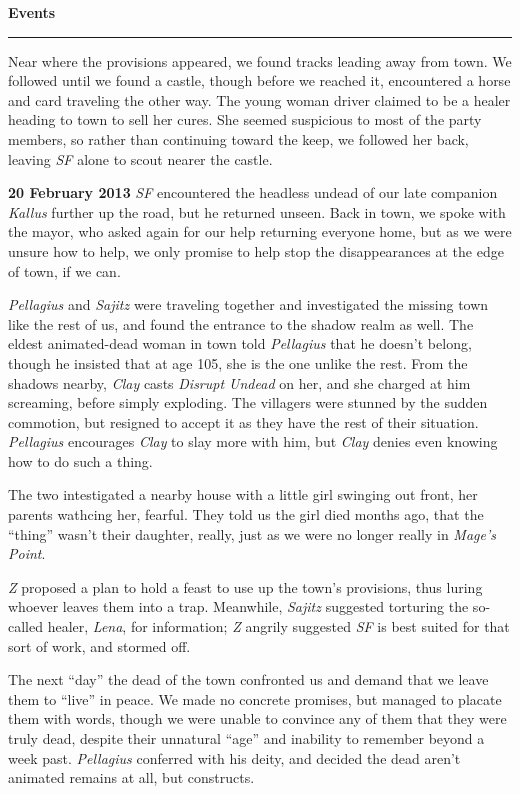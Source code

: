 \documentclass[letterpaper]{article}
\newcommand{\e}[1]{\emph{#1}}
\newcommand{\B}[1]{\textbf{#1}}
\newenvironment{notesection}[1]
{ {\huge \B{#1}}\hrule\vspace{0.5em}\begingroup\fontsize{9pt}{12pt}\selectfont}
{\endgroup}
\begin{document}
\begin{notesection}{Events}
Near where the provisions appeared, we found tracks leading away from town.  We followed until we found a castle, though before we reached it, encountered a horse and card traveling the other way.  The young woman driver claimed to be a healer heading to town to sell her cures.  She seemed suspicious to most of the party members, so rather than continuing toward the keep, we followed her back, leaving \e{SF} alone to scout nearer the castle.


\B{20 February 2013} \e{SF} encountered the headless undead of our late companion \e{Kallus} further up the road, but he returned unseen.  Back in town, we spoke with the mayor, who asked again for our help returning everyone home, but as we were unsure how to help, we only promise to help stop the disappearances at the edge of town, if we can.

\e{Pellagius} and \e{Sajitz} were traveling together and investigated the missing town like the rest of us, and found the entrance to the shadow realm as well.  The eldest animated-dead woman in town told \e{Pellagius} that he doesn't belong, though he insisted that at age 105, she is the one unlike the rest.  From the shadows nearby, \e{Clay} casts \e{Disrupt Undead} on her, and she charged at him screaming, before simply exploding.  The villagers were stunned by the sudden commotion, but resigned to accept it as they have the rest of their situation.  \e{Pellagius} encourages \e{Clay} to slay more with him, but \e{Clay} denies even knowing how to do such a thing.

The two intestigated a nearby house with a little girl swinging out front, her parents wathcing her, fearful. They told us the girl died months ago, that the ``thing'' wasn't their daughter, really, just as we were no longer really in \e{Mage's Point}.

\e{Z} proposed a plan to hold a feast to use up the town's provisions, thus luring whoever leaves them into a trap.  Meanwhile, \e{Sajitz} suggested torturing the so-called healer, \e{Lena}, for information; \e{Z} angrily suggested \e{SF} is best suited for that sort of work, and stormed off.

The next ``day'' the dead of the town confronted us and demand that we leave them to ``live'' in peace.  We made no concrete promises, but managed to placate them with words, though we were unable to convince any of them that they were truly dead, despite their unnatural ``age'' and inability to remember beyond a week past.  \e{Pellagius} conferred with his deity, and decided the dead aren't animated remains at all, but constructs.


\end{notesection}
\end{document}
